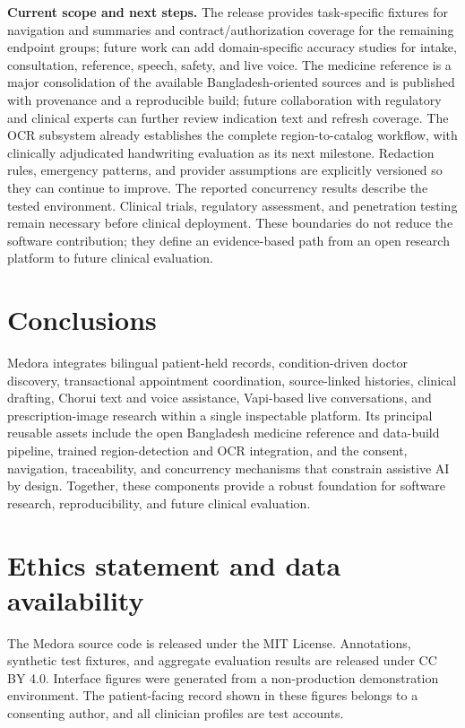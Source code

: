 \documentclass[preprint,12pt,a4paper]{elsarticle}
\begin{document}
\textbf{Current scope and next steps.} The release provides task-specific fixtures for
navigation and summaries and contract/authorization coverage for the remaining endpoint
groups; future work can add domain-specific accuracy studies for intake, consultation,
reference, speech, safety, and live voice. The medicine reference is a major consolidation
of the available Bangladesh-oriented sources and is published with provenance and a
reproducible build; future collaboration with regulatory and clinical experts can further
review indication text and refresh coverage. The OCR subsystem already establishes the
complete region-to-catalog workflow, with clinically adjudicated handwriting evaluation as
its next milestone. Redaction rules, emergency patterns, and provider assumptions are
explicitly versioned so they can continue to improve. The reported concurrency results
describe the tested environment. Clinical trials, regulatory assessment, and penetration
testing remain necessary before clinical deployment.
These boundaries do not reduce the software contribution; they define an evidence-based
path from an open research platform to future clinical evaluation.

\section{Conclusions}
Medora integrates bilingual patient-held records, condition-driven doctor discovery, transactional appointment coordination, source-linked histories, clinical drafting, Chorui text and voice assistance, Vapi-based live conversations, and prescription-image research within a single inspectable platform. Its principal reusable assets include the open Bangladesh medicine reference and data-build pipeline, trained region-detection and OCR integration, and the consent, navigation, traceability, and concurrency mechanisms that constrain assistive AI by design. Together, these components provide a robust foundation for software research, reproducibility, and future clinical evaluation. 

\section*{Ethics statement and data availability}
\label{sec:ethics}

The Medora source code is released under the MIT License. Annotations, synthetic
test fixtures, and aggregate evaluation results are released under CC BY 4.0.
Interface figures were generated from a non-production demonstration environment.
The patient-facing record shown in these figures belongs to a consenting author,
and all clinician profiles are test accounts.
\end{document}
